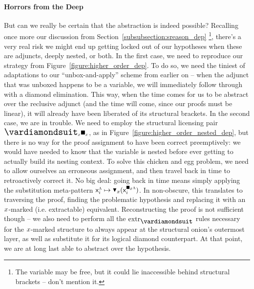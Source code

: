 \paragraph{Horrors from the Deep}
But can we really be certain that the abstraction is indeed possible?
Recalling once more our discussion from Section~\ref{subsubsection:sreason_dep}%
	\footnote{The variable may be free, but it could lie inaccessible behind structural brackets -- don't mention it.},
there's a very real risk we might end up getting locked out of our hypotheses when these are adjuncts, deeply nested, or both.
In the first case, we need to reproduce our strategy from Figure~\ref{figure:higher_order_dep}.
To do so, we need the tiniest of adaptations to our ``unbox-and-apply'' scheme from earlier on -- when the adjunct that was unboxed happens to be a variable, we will immediately follow through with a diamond elimination.
This way, when the time comes for us to be abstract over the reclusive adjunct (and the time will come, since our proofs must be linear), it will already have been liberated of its structural brackets.
In the second case, we are in trouble. 
We need to employ the structural licensing pair $\dxdia{x}\dxbox{x}$, as in Figure~\ref{figure:higher_order_nested_dep}, but there is no way for the proof assignment to have been correct preemptively: we would have needed to know that the variable is nested before ever getting to actually build its nesting context.
To solve this chicken and egg problem, we need to allow ourselves an erroneous assignment, and then travel back in time to retroactively correct it.
No big deal: going back in time means simply applying the substitution meta-pattern $\vari^{\smallgtype{a}} \mapsto \dboxelim{x}(\vari^{\dxbox{x}\smallgtype{a}})$.
In non-obscure\hide[ language]{}, this translates to traversing the proof, finding the problematic hypothesis and replacing it with an $\mathnormal{x}$-marked (i.e. extractable) equivalent.
Reconstructing the proof is not sufficient though -- we also need to perform all the $\Extraction$ rules necessary for the $\mathnormal{x}$-marked structure to always appear at the structural onion's outermost layer, as well as substitute it for its logical diamond counterpart.
At that point, we are at long last able to abstract over the hypothesis.

